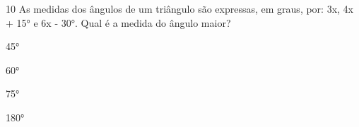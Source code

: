 











\num{10} As medidas dos ângulos de um triângulo são expressas, em graus, por:
3x, 4x + 15° e 6x - 30°. Qual é a medida do ângulo maior?

\begin{escolha}
\item 45°
\item 60°
\item 75°
\item 180°
\end{escolha}





